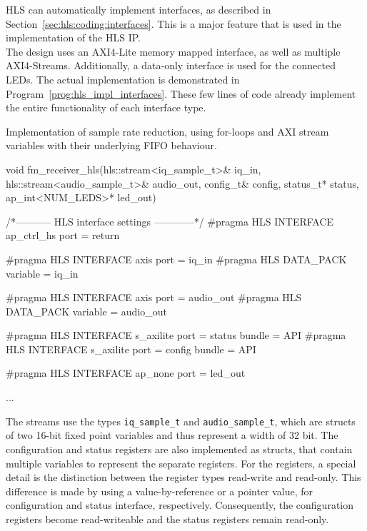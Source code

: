 HLS can automatically implement interfaces, as described in Section~\ref{sec:hls:coding:interfaces}.
This is a major feature that is used in the implementation of the HLS IP.\\

The design uses an AXI4-Lite memory mapped interface, as well as multiple AXI4-Streams.
Additionally, a data-only interface is used for the connected LEDs.
The actual implementation is demonstrated in Program~\ref{prog:hls_impl_interfaces}.
These few lines of code already implement the entire functionality of each interface type.\\


\begin{program}
  \caption{Implementation of sample rate reduction, using for-loops and AXI stream variables with their underlying FIFO behaviour.}
  \label{prog:hls_impl_interfaces}
\begin{CppCode}
void fm_receiver_hls(hls::stream<iq_sample_t>& iq_in,
                     hls::stream<audio_sample_t>& audio_out,
                     config_t& config,
                     status_t* status,
                     ap_int<NUM_LEDS>* led_out) {

  /*----------- HLS interface settings ------------*/
  #pragma HLS INTERFACE ap_ctrl_hs port = return

  #pragma HLS INTERFACE axis port = iq_in
  #pragma HLS DATA_PACK variable  = iq_in

  #pragma HLS INTERFACE axis port = audio_out
  #pragma HLS DATA_PACK variable  = audio_out

  #pragma HLS INTERFACE s_axilite port = status bundle = API
  #pragma HLS INTERFACE s_axilite port = config bundle = API

  #pragma HLS INTERFACE ap_none port = led_out

  ...
}
\end{CppCode}
\end{program}

The streams use the types \texttt{iq\_sample\_t} and \texttt{audio\_sample\_t}, which are structs of two 16-bit fixed point variables and thus represent a width of 32 bit.
The configuration and status registers are also implemented as structs, that contain multiple variables to represent the separate registers.
For the registers, a special detail is the distinction between the register types read-write and read-only.
This difference is made by using a value-by-reference or a pointer value, for configuration and status interface, respectively.
Consequently, the configuration registers become read-writeable and the status registers remain read-only.\\

